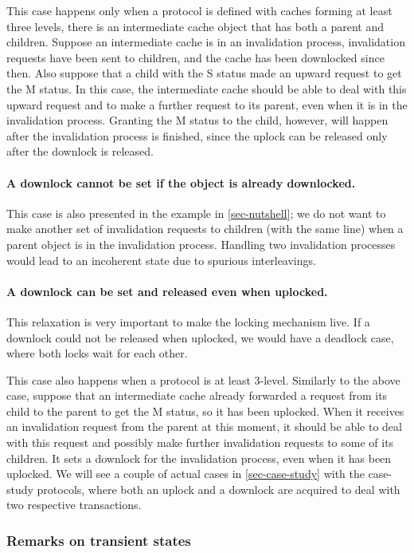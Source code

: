 This case happens only when a protocol is defined with caches forming at least three levels, \ie{} there is an intermediate cache object that has both a parent and children.
Suppose an intermediate cache is in an invalidation process, \ie{} invalidation requests have been sent to children, and the cache has been downlocked since then.
Also suppose that a child with the S status made an upward request to get the M status.
In this case, the intermediate cache should be able to deal with this upward request and to make a further request to its parent, even when it is in the invalidation process.
Granting the M status to the child, however, will happen after the invalidation process is finished, since the uplock can be released only after the downlock is released.

\paragraph{A downlock cannot be set if the object is already downlocked.}
This case is also presented in the example in \autoref{sec-nutshell}; we do not want to make another set of invalidation requests to children (with the same line) when a parent object is in the invalidation process.
Handling two invalidation processes would lead to an incoherent state due to spurious interleavings.

\paragraph{A downlock can be set and released even when uplocked.}
This relaxation is very important to make the locking mechanism live.
If a downlock could not be released when uplocked, we would have a deadlock case, where both locks wait for each other.

This case also happens when a protocol is at least 3-level.
Similarly to the above case, suppose that an intermediate cache already forwarded a request from its child to the parent to get the M status, so it has been uplocked.
When it receives an invalidation request from the parent at this moment, it should be able to deal with this request and possibly make further invalidation requests to some of its children.
It sets a downlock for the invalidation process, even when it has been uplocked.
We will see a couple of actual cases in \autoref{sec-case-study} with the case-study protocols, where both an uplock and a downlock are acquired to deal with two respective transactions.

\subsubsection{Remarks on transient states}

